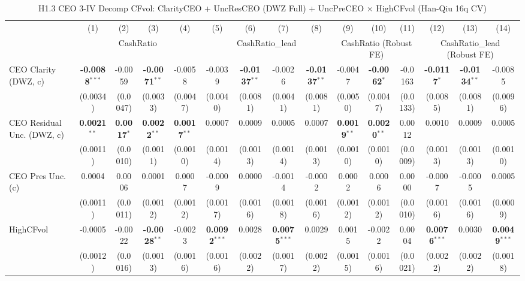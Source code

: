\begin{landscape}
\begin{table}[H]
\setlength{\tabcolsep}{3pt}
\renewcommand{\arraystretch}{0.85}
\centering
\caption{H1.3 CEO 3-IV Decomp CFvol: ClarityCEO + UncResCEO (DWZ Full) + UncPreCEO $\times$ HighCFvol (Han-Qiu 16q CV)}
\label{tab:h1_3_cfvol}
\scriptsize
\begin{tabular}{lcccccccccccccc}
\toprule
 & (1) & (2) & (3) & (4) & (5) & (6) & (7) & (8) & (9) & (10) & (11) & (12) & (13) & (14) \\
 & \multicolumn{4}{c}{CashRatio} & \multicolumn{4}{c}{CashRatio\_lead} & \multicolumn{3}{c}{CashRatio (Robust FE)} & \multicolumn{3}{c}{CashRatio\_lead (Robust FE)} \\
\cmidrule(lr){2-5} \cmidrule(lr){6-9} \cmidrule(lr){10-12} \cmidrule(lr){13-15}
\midrule
CEO Clarity (DWZ, c) & \textbf{-0.0088}$^{***}$ & -0.0059 & \textbf{-0.0071}$^{**}$ & -0.0058 & -0.0039 & \textbf{-0.0137}$^{**}$ & -0.0026 & \textbf{-0.0137}$^{**}$ & -0.0047 & \textbf{-0.0062}$^{*}$ & -0.0163 & \textbf{-0.0117}$^{*}$ & \textbf{-0.0134}$^{**}$ & -0.0085 \\
 & (0.0034) & (0.0047) & (0.0033) & (0.0047) & (0.0040) & (0.0081) & (0.0041) & (0.0081) & (0.0050) & (0.0047) & (0.0133) & (0.0085) & (0.0081) & (0.0096) \\
CEO Residual Unc. (DWZ, c) & \textbf{0.0021}$^{**}$ & \textbf{0.0017}$^{*}$ & \textbf{0.0022}$^{**}$ & \textbf{0.0017}$^{**}$ & 0.0007 & 0.0009 & 0.0005 & 0.0007 & \textbf{0.0019}$^{**}$ & \textbf{0.0020}$^{**}$ & 0.0012 & 0.0010 & 0.0009 & 0.0005 \\
 & (0.0011) & (0.0010) & (0.0011) & (0.0010) & (0.0014) & (0.0013) & (0.0014) & (0.0013) & (0.0010) & (0.0010) & (0.0009) & (0.0013) & (0.0013) & (0.0010) \\
CEO Pres Unc. (c) & 0.0004 & 0.0006 & 0.0001 & 0.0007 & -0.0009 & 0.0000 & -0.0014 & -0.0002 & 0.0002 & 0.0006 & 0.0000 & -0.0007 & -0.0005 & 0.0005 \\
 & (0.0011) & (0.0011) & (0.0012) & (0.0012) & (0.0017) & (0.0016) & (0.0018) & (0.0016) & (0.0012) & (0.0012) & (0.0010) & (0.0016) & (0.0016) & (0.0009) \\
HighCFvol & -0.0005 & -0.0022 & \textbf{-0.0028}$^{**}$ & -0.0023 & \textbf{0.0092}$^{***}$ & 0.0028 & \textbf{0.0075}$^{***}$ & 0.0029 & 0.0015 & -0.0022 & 0.0004 & \textbf{0.0076}$^{***}$ & 0.0030 & \textbf{0.0049}$^{***}$ \\
 & (0.0012) & (0.0016) & (0.0013) & (0.0016) & (0.0016) & (0.0022) & (0.0017) & (0.0022) & (0.0015) & (0.0016) & (0.0021) & (0.0022) & (0.0022) & (0.0018) \\

\end{tabular}
\end{table}
\end{landscape}

